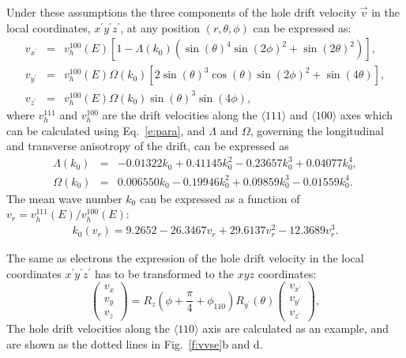 \documentclass[epj]{svjour}
\begin{document}
Under these assumptions the three components of the hole drift
velocity $\vec{v}$ in the local coordinates, $x^{\prime} y^{\prime}
z^{\prime}$, at any position $(r, \theta, \phi)$ can be expressed as:
\begin{eqnarray*} 
\label{e:vsphere} 
v_{x^{\prime}} &=& v^{100}_{h}(E)
[1-\Lambda(k_{0})(\sin(\theta)^{4}\sin(2\phi)^{2} + \sin(2\theta)^{2})],\\ 
v_{y^{\prime}} &=& v^{100}_{h}(E)\Omega(k_{0})
[2\sin(\theta)^{3}\cos(\theta)\sin(2\phi)^{2} + \sin(4\theta)],\\ 
v_{z^{\prime}} &=& v^{100}_{h}(E)\Omega(k_{0})\sin(\theta)^{3}\sin(4\phi), 
\end{eqnarray*} 
where $v^{111}_{h}$ and $v^{100}_{h}$ are the drift velocities along
the $\langle 111 \rangle$ and $\langle 100 \rangle$ axes which can be
calculated using Eq.~\ref{e:para}, and $\Lambda$ and $\Omega$,
governing the longitudinal and transverse anisotropy of the drift, can
be expressed as
\begin{eqnarray*} 
\label{e:lamb} 
\Lambda(k_{0}) &=& -0.01322k_{0} + 0.41145k_{0}^{2} - 0.23657k_{0}^{3} + 0.04077k_{0}^{4},\\
\Omega(k_{0}) &=& 0.006550k_{0} - 0.19946k_{0}^{2} + 0.09859k_{0}^{3} - 0.01559k_{0}^{4}. 
\end{eqnarray*} 
The mean wave number $k_{0}$ can be expressed as a function of
$v_{r} = v^{111}_{h}(E)/v^{100}_{h}(E)$:
\begin{eqnarray*} 
\label{e:k0} 
k_{0}(v_{r}) = 9.2652 - 26.3467v_{r} + 29.6137v_{r}^{2} - 12.3689v_{r}^{3}. 
\end{eqnarray*} 
 
The same as electrons the expression of the hole drift velocity in the
local coordinates $x^{\prime} y^{\prime} z^{\prime}$ has to be
transformed to the $xyz$ coordinates: 
\begin{equation} 
\label{e:v2v}   
\left( 
\begin{array}{c} 
v_{x} \\ v_{y} \\ v_{z} 
\end{array} 
\right) = R_{z}(\phi + \frac{\pi}{4} + \phi_{110}) R_{y^{\prime}}(\theta) \left(  
\begin{array}{c} 
v_{x^{\prime}} \\ v_{y^{\prime}} \\ v_{z^{\prime}} 
\end{array} \right), 
\end{equation}
The hole drift velocities along the $\langle 110 \rangle$ axis are
calculated as an example, and are shown as the dotted lines in
Fig.~\ref{f:vvse}b and d.
\end{document}
